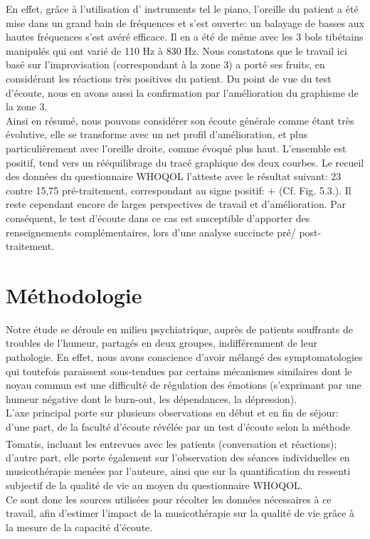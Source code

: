  En effet, 
 grâce à l'utilisation d' instruments tel le piano,  l'oreille du patient a été mise dans un grand bain de 
 fréquences 
 et  s'est ouverte: un balayage 
 de  basses aux hautes fréquences s'est avéré efficace. Il en a été de même avec les 3 bols tibétains 
 manipulés 
 qui ont varié de 110 Hz à 830 Hz.
 Nous constatons que le travail ici  basé sur l'improvisation (correspondant à la zone 3) a porté ses fruits, 
 en considérant les 
 réactions très positives du patient. 
 Du point de vue du test d'écoute, nous en avons aussi  la confirmation par l'amélioration du  graphisme 
 de la zone 3.
 \\
Ainsi en résumé, nous pouvons considérer son écoute générale comme étant très évolutive, elle se 
transforme avec un net profil 
d'amélioration, et 
plus particulièrement avec l'oreille
droite, comme évoqué plus haut. L'ensemble est positif, tend vers un
rééquilibrage du tracé graphique des deux courbes. Le recueil des données du
questionnaire WHOQOL l'atteste avec le résultat suivant: 23 contre 15,75 pré-traitement, correspondant
au signe positif: $+$ (Cf. Fig. 5.3.).
Il reste cependant encore de larges perspectives de travail et d'amélioration.
Par conséquent, le test d'écoute dans ce cas est susceptible d'apporter des renseignements 
complémentaires, lors
d'une analyse succincte pré/ post-traitement.


\chapter{Méthodologie} 

Notre étude se déroule en milieu psychiatrique, 
auprès de patients souffrants de troubles de l'humeur, partagés en deux groupes, indifféremment de leur 
pathologie. En effet, nous avons conscience d'avoir mélangé des symptomatologies qui toutefois 
paraissent sous-tendues par certains mécanismes similaires dont le noyau commun est une difficulté 
de	
régulation des émotions (s'exprimant  par une humeur négative dont le burn-out, les dépendances, la 
dépression).
\\
L'axe principal  porte  sur plusieurs observations en début et en fin de séjour: d'une part, de la faculté 
d'écoute révélée par un test 
d'écoute selon la méthode Tomatis\textsuperscript \textregistered, incluant les entrevues avec les 
patients (conversation et réactions);  %
d'autre part, elle porte également sur  l'observation
des séances individuelles en 
musicothérapie menées par l'auteure, ainsi que  sur la 
quantification du ressenti subjectif de la qualité de vie au moyen du 
questionnaire WHOQOL. 
\\
Ce sont donc les sources utilisées pour récolter les données nécessaires à 
ce 
travail, afin d'estimer l'impact de la musicothérapie sur la qualité de vie grâce à la mesure de la capacité 
d'écoute.

